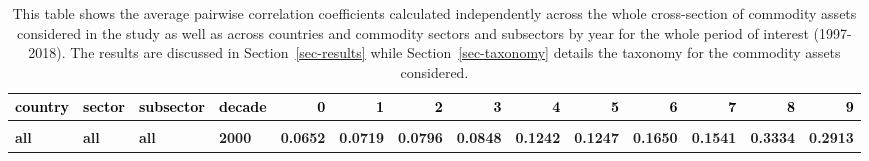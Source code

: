 \documentclass[
  authoryear,
  preprint,
  3p]{elsarticle}
\begin{document}
\begin{landscape}\begingroup\fontsize{7}{9}\selectfont

\begin{longtable}[t]{>{}l>{}l>{}l>{}l>{}r>{}r>{}r>{}r>{}r>{}r>{}r>{}r>{}r>{}r}

\caption{\label{tbl-correlations-years}This table shows the average
pairwise correlation coefficients calculated independently across the
whole cross-section of commodity assets considered in the study as well
as across countries and commodity sectors and subsectors by year for the
whole period of interest (1997-2018). The results are discussed in
Section~\ref{sec-results} while Section~\ref{sec-taxonomy} details the
taxonomy for the commodity assets considered.}

\tabularnewline

\toprule
\textcolor{black}{\textbf{country}} & \textcolor{black}{\textbf{sector}} & \textcolor{black}{\textbf{subsector}} & \textcolor{black}{\textbf{decade}} & \textcolor{black}{\textbf{0}} & \textcolor{black}{\textbf{1}} & \textcolor{black}{\textbf{2}} & \textcolor{black}{\textbf{3}} & \textcolor{black}{\textbf{4}} & \textcolor{black}{\textbf{5}} & \textcolor{black}{\textbf{6}} & \textcolor{black}{\textbf{7}} & \textcolor{black}{\textbf{8}} & \textcolor{black}{\textbf{9}}\\
\midrule
\textbf{\cellcolor{gray!10}{all}} & \textbf{\cellcolor{gray!10}{all}} & \textbf{\cellcolor{gray!10}{all}} & \textbf{\cellcolor{gray!10}{1990}} & \textcolor[HTML]{4285f4}{\textbf{\cellcolor{gray!10}{}}} & \textcolor[HTML]{4285f4}{\textbf{\cellcolor{gray!10}{}}} & \textcolor[HTML]{4285f4}{\textbf{\cellcolor{gray!10}{}}} & \textcolor[HTML]{4285f4}{\textbf{\cellcolor{gray!10}{}}} & \textcolor[HTML]{4285f4}{\textbf{\cellcolor{gray!10}{}}} & \textcolor[HTML]{4285f4}{\textbf{\cellcolor{gray!10}{}}} & \textcolor[HTML]{4285f4}{\textbf{\cellcolor{gray!10}{}}} & \textcolor[HTML]{4285f4}{\textbf{\cellcolor{gray!10}{0.0401}}} & \textcolor[HTML]{4285f4}{\textbf{\cellcolor{gray!10}{0.0812}}} & \textcolor[HTML]{4285f4}{\textbf{\cellcolor{gray!10}{0.0822}}}\\
\textbf{all} & \textbf{all} & \textbf{all} & \textbf{2000} & \textcolor[HTML]{4285f4}{\textbf{0.0652}} & \textcolor[HTML]{4285f4}{\textbf{0.0719}} & \textcolor[HTML]{4285f4}{\textbf{0.0796}} & \textcolor[HTML]{4285f4}{\textbf{0.0848}} & \textcolor[HTML]{4285f4}{\textbf{0.1242}} & \textcolor[HTML]{4285f4}{\textbf{0.1247}} & \textcolor[HTML]{4285f4}{\textbf{0.1650}} & \textcolor[HTML]{4285f4}{\textbf{0.1541}} & \textcolor[HTML]{4285f4}{\textbf{0.3334}} & \textcolor[HTML]{4285f4}{\textbf{0.2913}}\\

\end{longtable}
\end{landscape}
\end{document}
